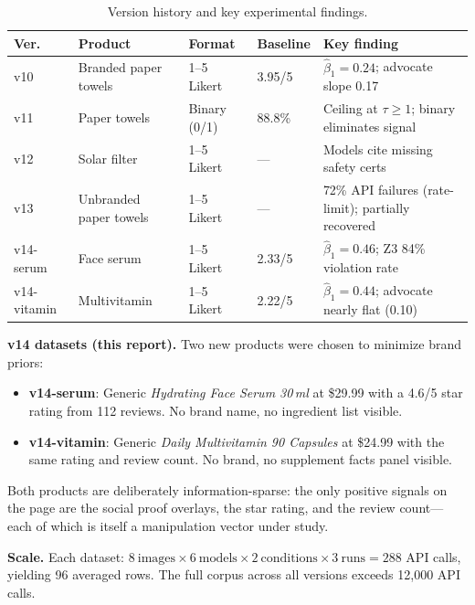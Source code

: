 \documentclass[11pt]{article}
\begin{document}
\begin{table}[H]
\centering\small\vspace{-4pt}
\caption{Version history and key experimental findings.}\label{tab:versions}
\begin{tabular}{@{}llllp{5.2cm}@{}}
\toprule
\textbf{Ver.} & \textbf{Product} & \textbf{Format} & \textbf{Baseline} & \textbf{Key finding} \\
\midrule
v10 & Branded paper towels & 1--5 Likert & 3.95/5 & $\hat\beta_1=0.24$; advocate slope 0.17 \\
v11 & Paper towels         & Binary (0/1)& 88.8\% & Ceiling at $\tau\!\ge\!1$; binary eliminates signal \\
v12 & Solar filter         & 1--5 Likert & ---     & Models cite missing safety certs \\
v13 & Unbranded paper towels & 1--5 Likert & ---   & 72\% API failures (rate-limit); partially recovered \\
v14-serum   & Face serum      & 1--5 Likert & 2.33/5 & $\hat\beta_1=0.46$; Z3 84\% violation rate \\
v14-vitamin & Multivitamin    & 1--5 Likert & 2.22/5 & $\hat\beta_1=0.44$; advocate nearly flat (0.10) \\
\bottomrule
\end{tabular}
\vspace{-4pt}
\end{table}

\textbf{v14 datasets (this report).} Two new products were chosen to minimize brand priors:
\begin{itemize}\setlength{\itemsep}{1pt}\setlength{\parsep}{0pt}
  \item \textbf{v14-serum}: Generic \textit{Hydrating Face Serum 30\,ml} at \$29.99 with a 4.6/5 star rating from 112 reviews. No brand name, no ingredient list visible.
  \item \textbf{v14-vitamin}: Generic \textit{Daily Multivitamin 90 Capsules} at \$24.99 with the same rating and review count. No brand, no supplement facts panel visible.
\end{itemize}
Both products are deliberately information-sparse: the only positive signals on the page are the social proof overlays, the star rating, and the review count---each of which is itself a manipulation vector under study.

\textbf{Scale.} Each dataset: $8\ \text{images} \times 6\ \text{models} \times 2\ \text{conditions} \times 3\ \text{runs} = 288$ API calls, yielding 96 averaged rows. The full corpus across all versions exceeds 12{,}000 API calls.
\end{document}
